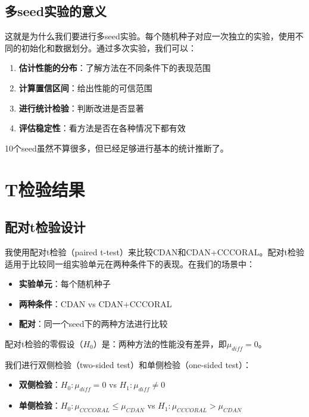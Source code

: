 \documentclass[12pt,a4paper]{ctexart}
\begin{document}
\subsection{多seed实验的意义}

这就是为什么我们要进行多seed实验。每个随机种子对应一次独立的实验，使用不同的初始化和数据划分。通过多次实验，我们可以：

\begin{enumerate}
    \item \textbf{估计性能的分布}：了解方法在不同条件下的表现范围
    \item \textbf{计算置信区间}：给出性能的可信范围
    \item \textbf{进行统计检验}：判断改进是否显著
    \item \textbf{评估稳定性}：看方法是否在各种情况下都有效
\end{enumerate}

10个seed虽然不算很多，但已经足够进行基本的统计推断了。

\section{T检验结果}

\subsection{配对t检验设计}

我使用配对t检验（paired t-test）来比较CDAN和CDAN+CCCORAL。配对t检验适用于比较同一组实验单元在两种条件下的表现。在我们的场景中：

\begin{itemize}
    \item \textbf{实验单元}：每个随机种子
    \item \textbf{两种条件}：CDAN vs CDAN+CCCORAL
    \item \textbf{配对}：同一个seed下的两种方法进行比较
\end{itemize}

配对t检验的零假设（$H_0$）是：两种方法的性能没有差异，即$\mu_{diff} = 0$。

我们进行双侧检验（two-sided test）和单侧检验（one-sided test）：
\begin{itemize}
    \item \textbf{双侧检验}：$H_0: \mu_{diff} = 0$ vs $H_1: \mu_{diff} \neq 0$
    \item \textbf{单侧检验}：$H_0: \mu_{CCCORAL} \leq \mu_{CDAN}$ vs $H_1: \mu_{CCCORAL} > \mu_{CDAN}$
\end{itemize}
\end{document}
